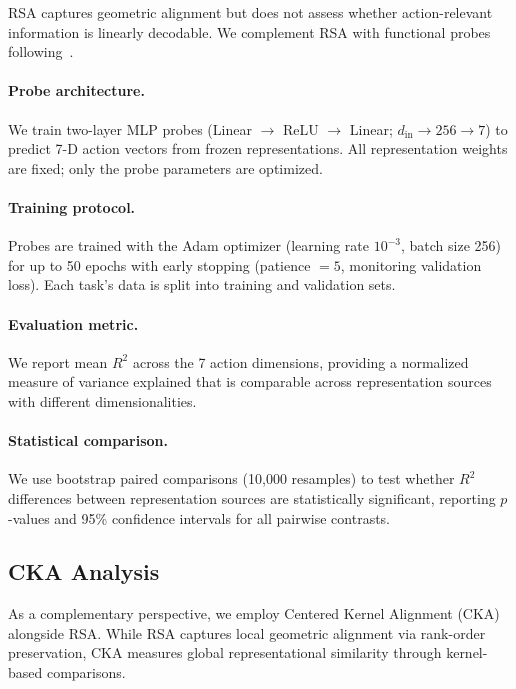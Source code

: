 RSA captures geometric alignment but does not assess whether action-relevant information is linearly decodable.
We complement RSA with functional probes following~\cite{alain2017}.

\paragraph{Probe architecture.}
We train two-layer MLP probes (Linear $\to$ ReLU $\to$ Linear; $d_\text{in} \to 256 \to 7$) to predict 7-D action vectors from frozen representations.
All representation weights are fixed; only the probe parameters are optimized.

\paragraph{Training protocol.}
Probes are trained with the Adam optimizer (learning rate $10^{-3}$, batch size 256) for up to 50 epochs with early stopping (patience $= 5$, monitoring validation loss).
Each task's data is split into training and validation sets.

\paragraph{Evaluation metric.}
We report mean $R^2$ across the 7 action dimensions, providing a normalized measure of variance explained that is comparable across representation sources with different dimensionalities.

\paragraph{Statistical comparison.}
We use bootstrap paired comparisons (10{,}000 resamples) to test whether $R^2$ differences between representation sources are statistically significant, reporting $p$-values and 95\% confidence intervals for all pairwise contrasts.

\subsection{CKA Analysis}
\label{sec:cka}

As a complementary perspective, we employ Centered Kernel Alignment (CKA)~\cite{kornblith2019} alongside RSA.
While RSA captures local geometric alignment via rank-order preservation, CKA measures global representational similarity through kernel-based comparisons.

